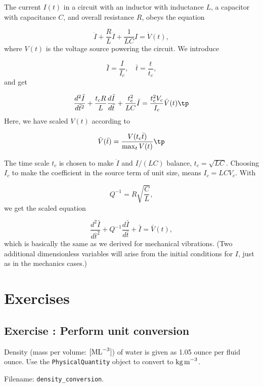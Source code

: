 \documentclass[graybox,envcountchap,sectrefs,final]{svmonodo}
\newenvironment{doconceexercise}{}{}
\newcounter{doconceexercisecounter}
\begin{document}
The current $I(t)$ in a
circuit with an inductor with inductance $L$, a capacitor with
capacitance $C$, and overall resistance $R$, obeys the equation

\begin{equation}
\ddot I + \frac{R}{L}\dot I + \frac{1}{LC}I = \dot V(t),
\end{equation}
where $V(t)$ is the voltage source powering the circuit.
We introduce

\[ \bar I=\frac{I}{I_c},\quad \bar t = \frac{t}{t_c},\]
and get

\[ \frac{d^2\bar I}{d\bar t^2} + \frac{t_c R}{L}\frac{d\bar I}{d\bar t}
+ \frac{t_c^2}{LC}\bar I = \frac{t_c^2V_c}{I_c} \bar V(t)\tp\]
Here, we have scaled $V(t)$ according to

\[ \bar V(\bar t) = \frac{V(t_c\bar t)}{\max_t V(t)}\tp\]

The time scale $t_c$ is chosen to make $\ddot I$ and $I/(LC)$ balance,
$t_c = \sqrt{LC}$.
Choosing $I_c$ to make the coefficient in the source term of unit size,
means $I_c = LCV_c$.
With

\[ Q^{-1} = R\sqrt{\frac{C}{L}},\]
we get the scaled equation

\begin{equation}
\frac{d^2\bar I}{d\bar t^2} + Q^{-1}\frac{d\bar I}{d\bar t}
+ \bar I = \bar V(t),
\end{equation}
which is basically the same as we derived for mechanical vibrations.
(Two additional dimensionless variables will arise from the initial
conditions for $I$, just as in the mechanics cases.)

\section{Exercises}



\begin{doconceexercise}

\subsection*{Exercise \thedoconceexercisecounter: Perform unit conversion}

\label{sec:scale:exer:US2SI1}

Density (mass per volume: $[\hbox{ML}^{-3}]$) of water is
given as 1.05 ounce per fluid ounce. Use the \texttt{PhysicalQuantity} object
to convert to $\hbox{kg\,m}^{-3}$.


\noindent Filename: \Verb!density_conversion!.

\end{doconceexercise}
\end{document}
